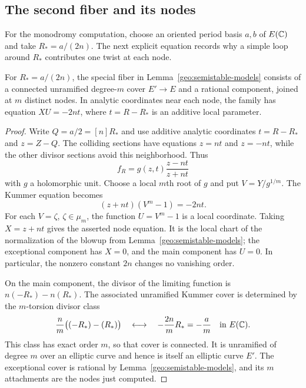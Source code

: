 \subsection{The second fiber and its nodes}

For the monodromy computation, choose an oriented period basis $a,b$
of $E(\mathbb C)$ and take $R_*=a/(2n)$.  The next explicit equation records
why a simple loop around $R_*$ contributes one twist at each node.

\begin{lemma}\label{geo:collision}
For $R_*=a/(2n)$, the special fiber in
Lemma~\ref{geo:semistable-models} consists of a connected unramified
degree-$m$ cover $E'\to E$ and a rational component, joined at $m$
distinct nodes.  In analytic coordinates near each node, the family
has equation $XU=-2nt$, where $t=R-R_*$ is an additive local parameter.
\end{lemma}

\begin{proof}
Write $Q=a/2=[n]R_*$ and use additive analytic coordinates
$t=R-R_*$ and $z=Z-Q$.  The colliding sections have equations $z=nt$
and $z=-nt$, while the other divisor sections avoid this neighborhood.
Thus
\[
 f_R=g(z,t)\frac{z-nt}{z+nt}
\]
with $g$ a holomorphic unit.  Choose a local $m$th root of $g$ and put
$V=Y/g^{1/m}$.  The Kummer equation becomes
\begin{equation}\label{geo:node-equation}
 (z+nt)(V^m-1)=-2nt.
\end{equation}
For each $V=\zeta$, $\zeta\in\mu_m$, the function $U=V^m-1$ is a
local coordinate.  Taking $X=z+nt$ gives the asserted node equation.
It is the local chart of the normalization of the blowup from
Lemma~\ref{geo:semistable-models}; the exceptional component has
$X=0$, and the main component has $U=0$.  In particular, the nonzero
constant $2n$ changes no vanishing order.

On the main component, the divisor of the limiting function is
$n(-R_*)-n(R_*)$.  The associated unramified Kummer cover is determined
by the $m$-torsion divisor class
\[
 \frac{n}{m}\bigl((-R_*)-(R_*)\bigr)
 \quad\longleftrightarrow\quad
 -\frac{2n}{m}R_*=-\frac{a}{m}\quad\text{in }E(\mathbb C).
\]
This class has exact order $m$, so that cover is connected.  It is
unramified of degree $m$ over an elliptic curve and hence is itself
an elliptic curve $E'$.  The exceptional cover is rational by
Lemma~\ref{geo:semistable-models}, and its $m$ attachments are the
nodes just computed.
\end{proof}

